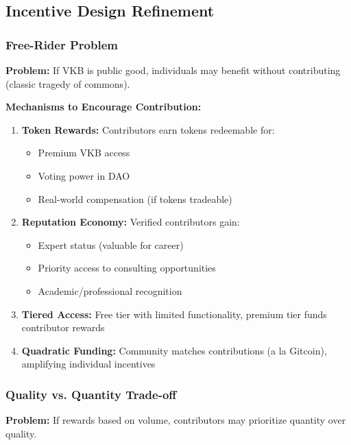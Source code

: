 \documentclass[11pt,a4paper]{article}
\theoremstyle{definition}
\theoremstyle{remark}
\newcommand{\VKB}{\textsc{VKB}}
\newcommand{\DAO}{\textsc{DAO}}
\begin{document}
\subsection{Incentive Design Refinement}

\subsubsection{Free-Rider Problem}

\textbf{Problem:} If \VKB{} is public good, individuals may benefit without contributing (classic tragedy of commons).

\textbf{Mechanisms to Encourage Contribution:}
\begin{enumerate}
    \item \textbf{Token Rewards:} Contributors earn tokens redeemable for:
    \begin{itemize}
        \item Premium \VKB{} access
        \item Voting power in \DAO{}
        \item Real-world compensation (if tokens tradeable)
    \end{itemize}
    
    \item \textbf{Reputation Economy:} Verified contributors gain:
    \begin{itemize}
        \item Expert status (valuable for career)
        \item Priority access to consulting opportunities
        \item Academic/professional recognition
    \end{itemize}
    
    \item \textbf{Tiered Access:} Free tier with limited functionality, premium tier funds contributor rewards
    
    \item \textbf{Quadratic Funding:} Community matches contributions (a la Gitcoin), amplifying individual incentives
\end{enumerate}

\subsubsection{Quality vs. Quantity Trade-off}

\textbf{Problem:} If rewards based on volume, contributors may prioritize quantity over quality.
\end{document}
